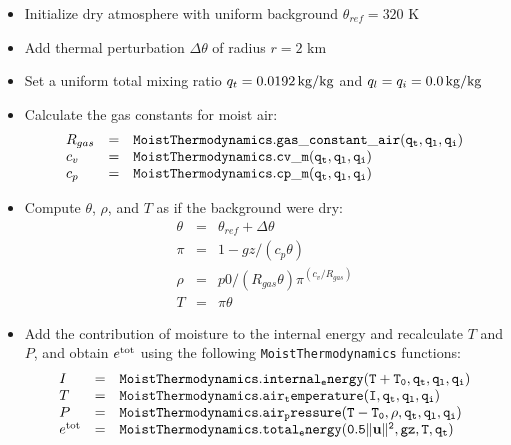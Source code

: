 \documentclass{article}
\begin{document}
\begin{itemize}
\item Initialize dry atmosphere with uniform background $\theta_{ref} = 320$ K
\item Add thermal perturbation $\Delta \theta$ of radius $r=2$ km
\item Set a uniform total mixing ratio $q_t = 0.0192 \,{\rm kg/kg}$ and $q_l = q_i = 0.0\,{\rm kg/kg}$
\item Calculate the gas constants for moist air: 
\[\begin{array}{lcl}
R_{gas} &=& {\tt MoistThermodynamics.gas\_constant\_air(q_t, q_l, q_i)}\\
c_v     &=& {\tt MoistThermodynamics.cv\_m(q_t, q_l, q_i)}\\
c_p     &=& {\tt MoistThermodynamics.cp\_m(q_t, q_l, q_i)}\\
\end{array}
\]
\item  Compute $\theta$, $\rho$, and $T$ as if the background were dry:\\
    \[ \begin{array}{lcl}
  \theta &=& \theta_{ref} + \Delta\theta\\
 \pi & =& 1 - gz/(c_p\theta)\\
 \rho & = & p0/(R_{gas}\theta)\pi^(c_v/R_{gas})\\
 T   & = &\pi \theta
\end{array}\]

\item Add the contribution of moisture to the internal energy and recalculate $T$ and $P$, and obtain $e^{\rm tot}$ using the following {\tt MoistThermodynamics} functions:
\[\begin{array}{lcl}
I &=& {\tt MoistThermodynamics.internal_energy(T + T_0, q_t, q_l, q_i)}\\
T &=& {\tt MoistThermodynamics.air_temperature(I, q_t, q_l, q_i)}\\
P &=& {\tt MoistThermodynamics.air_pressure(T - T_0, \rho, q_t, q_l, q_i)}\\
e^{\rm tot} &=& {\tt MoistThermodynamics.total_energy(0.5\|{\bf u} \|^2, gz, T, q_t)}
\end{array}\]
\end{itemize}

\end{document}
